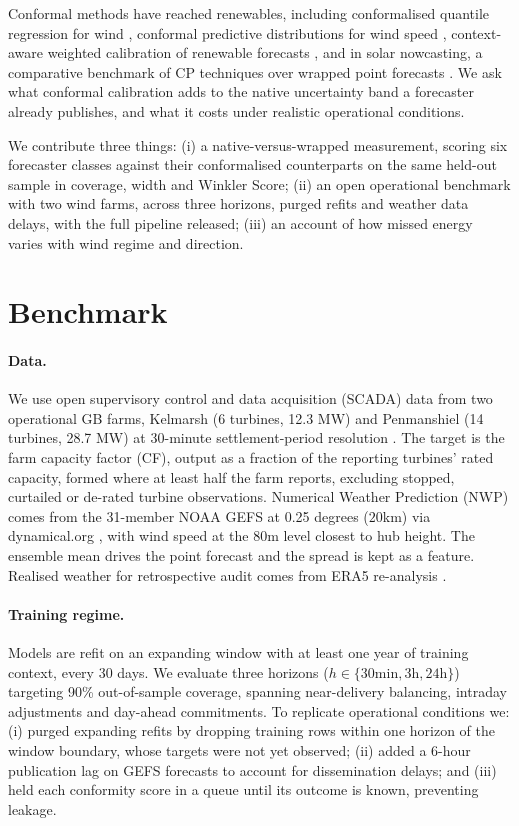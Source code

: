 \documentclass{article}
\begin{document}
Conformal methods have reached renewables, including conformalised quantile regression for wind \citep{jonkers2024novel}, conformal predictive distributions for wind speed \citep{althoff2023evaluation}, context-aware weighted calibration of renewable forecasts \citep{moradi2025enhanced}, and in solar nowcasting, a comparative benchmark of CP techniques over wrapped point forecasts \citep{NAM2025100573}. We ask what conformal calibration adds to the native uncertainty band a forecaster already publishes, and what it costs under realistic operational conditions.


We contribute three things: (i) a native-versus-wrapped measurement, scoring six forecaster classes against their conformalised counterparts on the same held-out sample in coverage, width and Winkler Score; (ii) an open operational benchmark with two wind farms, across three horizons, purged refits and weather data delays, with the full pipeline released; (iii) an account of how missed energy varies with wind regime and direction.

\section{Benchmark}

\paragraph{Data.} We use open supervisory control and data acquisition (SCADA) data from two operational GB farms, Kelmarsh (6 turbines, 12.3 MW) and Penmanshiel (14 turbines, 28.7 MW) at 30-minute settlement-period resolution \citep{plumley_2025_16807304, plumley_2025_16807551}. The target is the farm capacity factor (CF), output as a fraction of the reporting turbines' rated capacity, formed where at least half the farm reports, excluding stopped, curtailed or de-rated turbine observations. Numerical Weather Prediction (NWP) comes from the 31-member NOAA GEFS at 0.25 degrees ($20$km) via dynamical.org \citep{noaa_gefs_dynamical}, with wind speed at the 80m level closest to hub height. The ensemble mean drives the point forecast and the spread is kept as a feature. Realised weather for retrospective audit comes from ERA5 re-analysis \citep{hersbach2020ERA5}.

\paragraph{Training regime.} Models are refit on an expanding window with at least one year of training context, every 30 days. We evaluate three horizons ($h \in \{30\text{min}, 3\text{h}, 24\text{h}\}$) targeting 90\% out-of-sample coverage, spanning near-delivery balancing, intraday adjustments and day-ahead commitments. To replicate operational conditions we: (i) purged expanding refits by dropping training rows within one horizon of the window boundary, whose targets were not yet observed; (ii) added a 6-hour publication lag on GEFS forecasts to account for dissemination delays; and (iii) held each conformity score in a queue until its outcome is known, preventing leakage.
\end{document}
